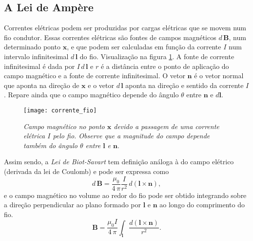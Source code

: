 \subsection{A Lei de Ampère}\label{sec.lei_ampere}
Correntes elétricas podem ser produzidas por cargas elétricas que se movem num fio condutor. Essas correntes elétricas são fontes de campos magnéticos $d\,\textbf{B}$, num determinado ponto $\mathbf{x}$, e que podem ser calculadas em função da corrente $I$ num intervalo infinitesimal $d\,\textbf{l}$ do fio. Visualização na figura \ref{fig.corrente_fio}. A fonte de corrente infinitesimal é dada por $I\,d\,\textbf{l}$ e $r$ é a distância entre o ponto de aplicação do campo magnético e a fonte de corrente infinitesimal. O vetor $\textbf{n}$ é o vetor normal que aponta na direção de $\mathbf{x}$ e o vetor $d\,\textbf{l}$ aponta na direção e sentido da corrente $I$. Repare ainda que o campo magnético depende do ângulo $\theta$ entre $\mathbf{n}$ e $d\mathbf{l}$.
\begin{figure}
\centering
\texttt{[image: corrente\_fio]}
\caption{\textit{Campo magnético no ponto $\mathbf{x}$ devido a passagem de uma corrente elétrica $I$ pelo fio. Observe que a magnitude do campo depende também do ângulo $\theta$ entre $\textbf{l}$ e $\textbf{n}$}.}
\label{fig.corrente_fio}
\end{figure}
Assim sendo, a \textit{Lei de Biot-Savart} tem definição análoga à do campo elétrico (derivada da lei de Coulomb) e pode ser expressa como
\begin{equation}\label{eq.lei_biot_savart}
d\,\textbf{B}=\frac{\mu_0}{4\,\pi}\frac{I}{r^2}\,d(\textbf{l}\times\textbf{n}),
\end{equation}
e o campo magnético no volume ao redor do fio pode ser obtido integrando sobre a direção perpendicular ao plano formado por $\textbf{l}$ e $\textbf{n}$ ao longo do comprimento do fio.
\begin{equation}
\textbf{B}=\frac{\mu_0I}{4\,\pi}\int_{\textbf{l}}\frac{d(\textbf{l}\times\textbf{n})}{r^2}.
\end{equation}

